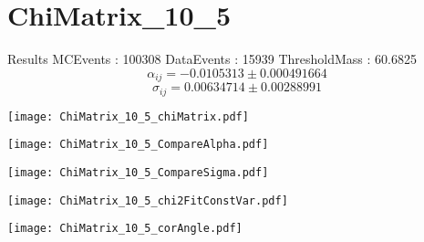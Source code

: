 \documentclass[a4paper,12pt]{article}
\begin{document}
\section{ChiMatrix\_10\_5}
\begin{minipage}{0.49\linewidth} Results \newline
MCEvents : 100308\newline
DataEvents : 15939 \newline
ThresholdMass : 60.6825\\
$$\alpha_{ij} = -0.0105313\pm 0.000491664$$
$$\sigma_{ij} = 0.00634714\pm 0.00288991$$
\end{minipage}\hfill
\begin{minipage}{0.49\linewidth} 
\texttt{[image: ChiMatrix\_10\_5\_chiMatrix.pdf]}\\
\end{minipage}
\hfill
\begin{minipage}{0.49\linewidth} 
\texttt{[image: ChiMatrix\_10\_5\_CompareAlpha.pdf]}\\
\end{minipage}
\hfill
\begin{minipage}{0.49\linewidth} 
\texttt{[image: ChiMatrix\_10\_5\_CompareSigma.pdf]}\\
\end{minipage}
\begin{minipage}{0.49\linewidth} 
\texttt{[image: ChiMatrix\_10\_5\_chi2FitConstVar.pdf]}\\
\end{minipage}
\hfill
\begin{minipage}{0.49\linewidth} 
\texttt{[image: ChiMatrix\_10\_5\_corAngle.pdf]}\\
\end{minipage}
\end{document}
